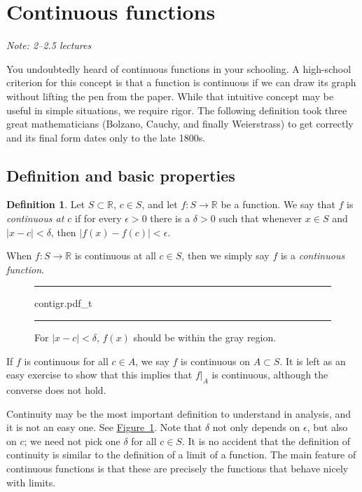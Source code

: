 \documentclass[12pt]{book}
\newenvironment{myfigureht}{%
\begin{figure}[h!t]
\noindent\rule{\textwidth}{0.4pt}\vspace{12pt}\par\centering}%
{\par\noindent\rule{\textwidth}{0.4pt}
\end{figure}}
\newcommand{\abs}[1]{\left\lvert {#1} \right\rvert}
\newcommand{\R}{{\mathbb{R}}}
\newcommand{\myindex}[1]{#1\index{#1}}
\newcommand{\sectionnotes}[1]{\noindent \emph{Note: #1} \medskip \par}
\newcommand{\sectionnewpage}{\clearpage}
\theoremstyle{plain}
\theoremstyle{remark}
\theoremstyle{definition}
\newtheorem{defn}[thm]{Definition}
\theoremstyle{exercise}
\theoremstyle{example}
\newcommand{\figureref}[1]{\hyperref[#1]{Figure~\ref*{#1}}}
\begin{document}

\sectionnewpage
\section{Continuous functions}
\label{sec:cont}

\sectionnotes{2--2.5 lectures}

You undoubtedly heard of continuous functions in your schooling.  A
high-school criterion for this concept is that a function is continuous if
we can draw its graph without lifting the pen from the paper.  While that
intuitive concept may be useful in simple situations, we require
rigor.  The following definition took three great mathematicians
(Bolzano, Cauchy, and finally Weierstrass) to get correctly and its final
form dates only to the late 1800s.

\subsection{Definition and basic properties}

\begin{defn}
Let $S \subset \R$, $c \in S$, and let $f \colon S \to \R$ be a function.
We say
that $f$ is \emph{continuous at $c$}
if for every $\epsilon > 0$
there is a $\delta > 0$ such that whenever $x \in S$ and $\abs{x-c} <
\delta$, then
$\abs{f(x)-f(c)} < \epsilon$.


When $f \colon S \to \R$ is continuous at all $c \in S$, then we simply say
$f$ is a \emph{\myindex{continuous function}}.
\end{defn}
\begin{myfigureht}
{contigr.pdf_t}
\caption{For $\abs{x-c} < \delta$, $f(x)$ should be within the gray region.\label{fig:contigr}}
\end{myfigureht}

If $f$ is continuous for all $c \in A$, we say
$f$ is continuous on $A \subset S$.  It is left as an easy exercise to
show that this implies that $f|_A$ is continuous, although
the converse does not hold.

Continuity may be the most important definition to understand in analysis,
and it is not an easy one.  See \figureref{fig:contigr}.
Note that $\delta$ not only
depends on $\epsilon$, but also on $c$;  we need not pick
one $\delta$ for all $c \in S$.
It is no accident 
that the definition of continuity is similar to the definition of a
limit of a function.  The main feature of continuous functions
is that these are precisely the functions that behave nicely with limits.
\end{document}
